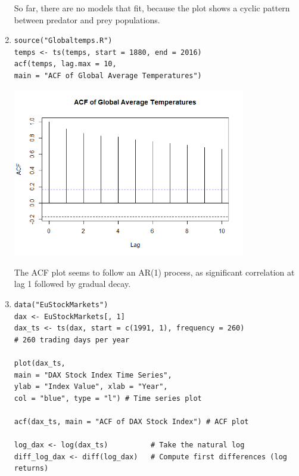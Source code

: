 \documentclass[12pt]{article}
\begin{document}
\begin{enumerate}
\begin{center}
    \end{center}
    So far, there are no models that fit, because the plot shows a cyclic pattern between
    predator and prey populations. 
    \item
\begin{verbatim}
source("Globaltemps.R")
temps <- ts(temps, start = 1880, end = 2016)
acf(temps, lag.max = 10, 
main = "ACF of Global Average Temperatures")
\end{verbatim}
    \begin{center}
        \includegraphics[width=0.8\textwidth]{Rplot02.png}
    \end{center}
    The ACF plot seems to follow an AR(1) process,
    as significant correlation at lag 1 followed by gradual decay.
    \item 
    \begin{verbatim}
data("EuStockMarkets")
dax <- EuStockMarkets[, 1]
dax_ts <- ts(dax, start = c(1991, 1), frequency = 260)
# 260 trading days per year

plot(dax_ts, 
main = "DAX Stock Index Time Series", 
ylab = "Index Value", xlab = "Year", 
col = "blue", type = "l") # Time series plot

acf(dax_ts, main = "ACF of DAX Stock Index") # ACF plot

log_dax <- log(dax_ts)          # Take the natural log
diff_log_dax <- diff(log_dax)   # Compute first differences (log returns)


\end{verbatim}
\end{enumerate}
\end{document}

